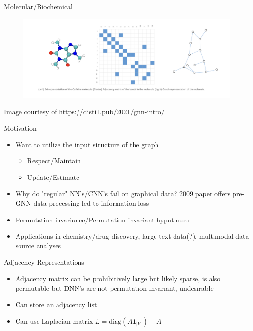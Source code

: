 \documentclass{beamer}
\newcommand{\NodeSet}{V}
\begin{document}
\begin{frame}{Molecular/Biochemical}
    \begin{figure}
        \centering
        \includegraphics[scale=0.3]{Caffeine_Graph.png}
    \end{figure}
    Image courtesy of \url{https://distill.pub/2021/gnn-intro/} \cite{sanchez-lengeling_gentle_2021}
\end{frame}



\begin{frame}{Motivation}
    \begin{itemize}
        \item Want to utilize the input structure of the graph
        \begin{itemize}
            \item Respect/Maintain
            \item Update/Estimate
        \end{itemize} 
        \item \color{red} Why do "regular" NN's/CNN's fail on graphical data? 2009 paper offers pre-GNN data processing led to information loss 
        \item Permutation invariance/Permutation invariant hypotheses 
        \item Applications in chemistry/drug-discovery, large text data(?), multimodal data source analyses 
    \end{itemize}
\end{frame}


\begin{frame}{Adjacency Representations}
\begin{itemize}\setlength\itemsep{8mm}
    \item Adjacency matrix can be prohibitively large but likely sparse, is also permutable but DNN's are not permutation invariant, undesirable 
    \item Can store an adjacency list
    \item Can use Laplacian matrix $L = \text{diag}(A\mathbf{1}_{|\NodeSet|}) - A$
    \end{itemize}
\end{frame}
\end{document}
